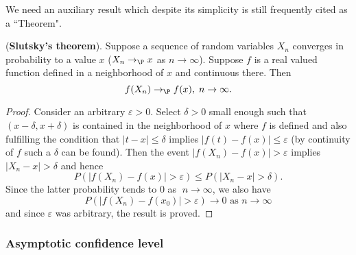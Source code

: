 We need an auxiliary result which despite its simplicity is still frequently
cited as a ``Theorem".

\begin{prop}
\label{theo-slutsky}(\textbf{Slutsky's theorem}). Suppose a sequence of
random variables $X_{n}$ converges in probability to a value $x$ ($%
X_{n}\rightarrow _{\P }x$ as $n\rightarrow \infty $). Suppose $f$ is a real
valued function defined in a neighborhood of $x$ and continuous there. Then 
\begin{equation*}
f(X_{n})\rightarrow _{\P }f(x),\;n\rightarrow \infty .
\end{equation*}
\end{prop}

\begin{proof}
Consider an arbitrary $\varepsilon >0$. Select $\delta >0$ small enough such
that $(x-\delta ,x+\delta )$ is contained in the neighborhood of $x$ where $%
f $ is defined and also fulfilling the condition that $\left\vert
t-x\right\vert \leq \delta $ implies $\left\vert f(t)-f(x)\right\vert \leq
\varepsilon $ (by continuity of $f$ such a $\delta $ can be found). Then the
event $\left\vert f(X_{n})-f(x)\right\vert >\varepsilon $ implies $%
\left\vert X_{n}-x\right\vert >\delta $ and hence 
\begin{equation*}
P\left( \left\vert f(X_{n})-f(x)\right\vert >\varepsilon \right) \leq
P\left( \left\vert X_{n}-x\right\vert >\delta \right) .
\end{equation*}%
Since the latter probability tends to $0$ as $\;n\rightarrow \infty $, we
also have 
\begin{equation*}
P\left( \left\vert f(X_{n})-f(x_{0})\right\vert >\varepsilon \right)
\rightarrow 0\text{ as }n\rightarrow \infty
\end{equation*}%
and since $\varepsilon $ was arbitrary, the result is proved.\bigskip
\end{proof}


\subsubsection{Asymptotic confidence level}\label{S:AsympConfLevel}

